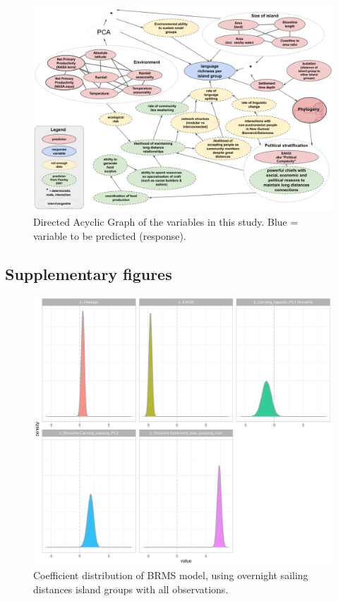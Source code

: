 \documentclass[a4paper,10pt]{article} %
\begin{document}
\begin{figure} 

\includegraphics[width=23cm]{Predicting_lgs_DAG_full.png}
\caption{Directed Acyclic Graph of the variables in this study. Blue = variable to be predicted (response).}
\label{Predicting_lgs_DAG_full}
\end{figure}


\newpage
\subsection{Supplementary figures}
\label{appendix_supp_figs}

\begin{figure}[ht]

\includegraphics[width=15cm]{brms_Marck_group_full_effect_ridge_panels_plot.png}
\caption{Coefficient distribution of BRMS model, using overnight sailing distances island groups with all observations.}
\label{brms_Marck_group_full_effect_ridge_panels}
\end{figure}
\end{document}
